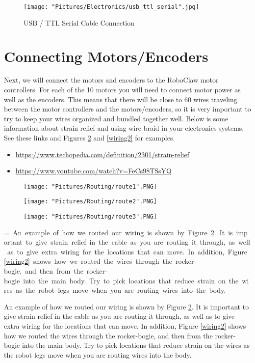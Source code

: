 \documentclass{article}
\makeatletter
\newcommand{\mybox}[1]{%
  \setbox0=\hbox{#1}%
  \setlength{\@tempdima}{\dimexpr\wd0+13pt}%
  \begin{tcolorbox}[colframe=mycolor,boxrule=0.5pt,arc=4pt,
      left=6pt,right=6pt,top=6pt,bottom=6pt,boxsep=0pt,width=0.95\textwidth]
    #1
  \end{tcolorbox}
}
\makeatother
\begin{document}
\begin{figure}[H]
	\centering
	\begin{minipage}[b]{0.45\textwidth}
		\texttt{[image: "Pictures/Electronics/usb\_ttl\_serial".jpg]}
	\end{minipage}
	\caption{USB / TTL Serial Cable Connection}
	\label{usb_ttl_serial}
\end{figure}

\section{Connecting Motors/Encoders}

Next, we will connect the motors and encoders to the RoboClaw motor controllers. For each of the 10 motors you will need to connect motor power as well as the encoders. This means that there will be close to 60 wires traveling between the motor controllers and the motors/encoders, so it is very important to try to keep your wires organized and bundled together well. Below is some information about strain relief and using wire braid in your electronics systems.  See these links and Figures \ref{wiring1} and \ref{wiring2} for examples.

\begin{itemize}
	\item \href{https://www.techopedia.com/definition/2301/strain-relief}{https://www.techopedia.com/definition/2301/strain-relief}
	\item \href{https://www.youtube.com/watch?v=FeCs98TSsYQ}{https://www.youtube.com/watch?v=FeCs98TSsYQ}
\end{itemize}


\begin{figure}[H]
  	\centering
  	\begin{minipage}[b]{0.34\textwidth}
    		\texttt{[image: "Pictures/Routing/route1".PNG]}
  	\end{minipage}
  	\hfill
  	\begin{minipage}[b]{0.29\textwidth}
    		\texttt{[image: "Pictures/Routing/route2".PNG]}
  	\end{minipage}
    	\hfill
  	\begin{minipage}[b]{0.30\textwidth}
    		\texttt{[image: "Pictures/Routing/route3".PNG]}
  	\end{minipage}
  	\caption{}
	\label{wiring1}
\end{figure}


\mybox{
An example of how we routed our wiring is shown by Figure \ref{wiring1}. It is important to give strain relief in the cable as you are routing it through, as well as to give extra wiring for the locations that can move. In addition, Figure \ref{wiring2} shows how we routed the wires through the rocker-bogie, and then from the rocker-bogie into the main body. Try to pick locations that reduce strain on the wires as the robot legs move when you are routing wires into the body.
}
\end{document}
